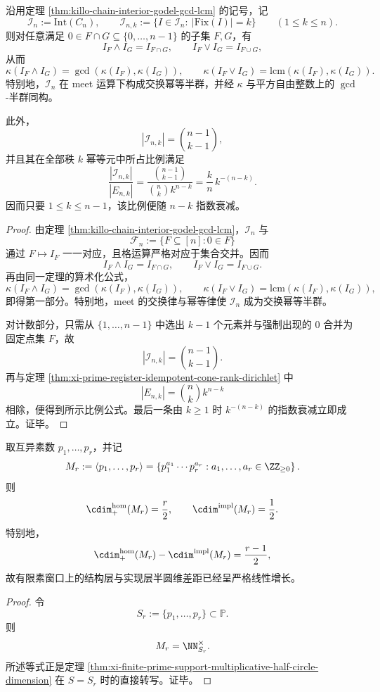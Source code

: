 \begin{theorem}\label{thm:xi-monotone-idempotent-skeleton-gcd-lcm-sparsity}
沿用定理 \ref{thm:killo-chain-interior-godel-gcd-lcm} 的记号，记
\[
\mathcal I_n:=\mathrm{Int}(C_n),
\qquad
\mathcal I_{n,k}:=\{I\in\mathcal I_n:\ |\mathrm{Fix}(I)|=k\}
\qquad(1\le k\le n).
\]
则对任意满足 \(0\in F\cap G\subseteq\{0,\dots,n-1\}\) 的子集 \(F,G\)，有
\[
I_F\wedge I_G=I_{F\cap G},
\qquad
I_F\vee I_G=I_{F\cup G},
\]
从而
\[
\kappa(I_F\wedge I_G)=\gcd(\kappa(I_F),\kappa(I_G)),
\qquad
\kappa(I_F\vee I_G)=\mathrm{lcm}(\kappa(I_F),\kappa(I_G)).
\]
特别地，\(\mathcal I_n\) 在 meet 运算下构成交换幂等半群，并经 \(\kappa\) 与平方自由整数上的 \(\gcd\)-半群同构。

此外，
\[
|\mathcal I_{n,k}|=\binom{n-1}{k-1},
\]
并且其在全部秩 \(k\) 幂等元中所占比例满足
\[
\frac{|\mathcal I_{n,k}|}{|E_{n,k}|}
=
\frac{\binom{n-1}{k-1}}{\binom{n}{k}k^{n-k}}
=
\frac{k}{n}\,k^{-(n-k)}.
\]
因而只要 \(1\le k\le n-1\)，该比例便随 \(n-k\) 指数衰减。
\end{theorem}
\begin{proof}
由定理 \ref{thm:killo-chain-interior-godel-gcd-lcm}，\(\mathcal I_n\) 与
\[
\mathcal F_n:=\{F\subseteq[n]:0\in F\}
\]
通过 \(F\mapsto I_F\) 一一对应，且格运算严格对应于集合交并。因而
\[
I_F\wedge I_G=I_{F\cap G},
\qquad
I_F\vee I_G=I_{F\cup G}.
\]
再由同一定理的算术化公式，
\[
\kappa(I_F\wedge I_G)=\gcd(\kappa(I_F),\kappa(I_G)),
\qquad
\kappa(I_F\vee I_G)=\mathrm{lcm}(\kappa(I_F),\kappa(I_G)),
\]
即得第一部分。特别地，meet 的交换律与幂等律使 \(\mathcal I_n\) 成为交换幂等半群。

对计数部分，只需从 \(\{1,\dots,n-1\}\) 中选出 \(k-1\) 个元素并与强制出现的 \(0\) 合并为固定点集 \(F\)，故
\[
|\mathcal I_{n,k}|=\binom{n-1}{k-1}.
\]
再与定理 \ref{thm:xi-prime-register-idempotent-cone-rank-dirichlet} 中
\[
|E_{n,k}|=\binom{n}{k}k^{n-k}
\]
相除，便得到所示比例公式。最后一条由 \(k\ge 1\) 时 \(k^{-(n-k)}\) 的指数衰减立即成立。证毕。
\end{proof}

\begin{theorem}[有限素窗口同态半圆维的严格线性差距]\label{thm:xi-finite-prime-window-halfcircle-linear-gap}
取互异素数 \(p_1,\dots,p_r\)，并记
\[
M_r:=\langle p_1,\dots,p_r\rangle
=
\left\{p_1^{a_1}\cdots p_r^{a_r}: a_1,\dots,a_r\in\ZZ_{\ge 0}\right\}.
\]
则
\[
\cdim^{\mathrm{hom}}_{+}(M_r)=\frac{r}{2},
\qquad
\cdim^{\mathrm{impl}}(M_r)=\frac12.
\]
特别地，
\[
\cdim^{\mathrm{hom}}_{+}(M_r)-\cdim^{\mathrm{impl}}(M_r)=\frac{r-1}{2},
\]
故有限素窗口上的结构层与实现层半圆维差距已经呈严格线性增长。
\end{theorem}
\begin{proof}
令
\[
S_r:=\{p_1,\dots,p_r\}\subset\mathbb P.
\]
则
\[
M_r=\NN_{S_r}^\times.
\]
所述等式正是定理 \ref{thm:xi-finite-prime-support-multiplicative-half-circle-dimension} 在 \(S=S_r\) 时的直接转写。证毕。
\end{proof}

